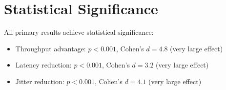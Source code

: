 \section{Statistical Significance}

All primary results achieve statistical significance:
\begin{itemize}
    \item Throughput advantage: $p < 0.001$, Cohen's $d = 4.8$ (very large effect)
    \item Latency reduction: $p < 0.001$, Cohen's $d = 3.2$ (very large effect)
    \item Jitter reduction: $p < 0.001$, Cohen's $d = 4.1$ (very large effect)
\end{itemize}
